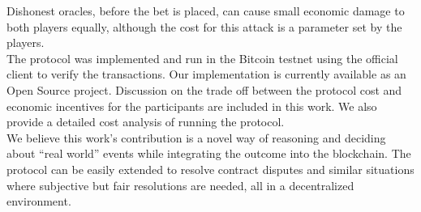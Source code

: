 Dishonest oracles, before the bet is placed, can cause small economic damage to
  both players equally, although the cost for this attack is a parameter set by
  the players.\\
\noindent
The protocol was implemented and run in the Bitcoin testnet using the official
  client to verify the transactions.
Our implementation is currently available as an Open Source project.
Discussion on the trade off between the protocol cost and economic incentives
  for the participants are included in this work.
We also provide a detailed cost analysis of running the protocol.\\
\noindent
We believe this work's contribution is a novel way of reasoning and deciding
  about ``real world'' events while integrating the outcome into the blockchain.
The protocol can be easily extended to resolve contract disputes and similar
  situations where subjective but fair resolutions are needed, all in a
  decentralized environment.
